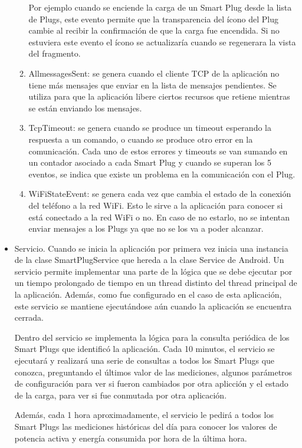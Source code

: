 \begin{itemize}
\begin{enumerate}
Por ejemplo cuando se enciende la carga de un Smart Plug desde la lista de Plugs, este evento permite que la transparencia del ícono del Plug cambie al recibir la confirmación de que la carga fue encendida. Si no estuviera este evento el ícono se actualizaría cuando se regenerara la vista del fragmento.
\item AllmessagesSent: se genera cuando el cliente TCP de la aplicación no tiene más mensajes que enviar en la lista de mensajes pendientes. Se utiliza para que la aplicación libere ciertos recursos que retiene mientras se están enviando los mensajes.
\item TcpTimeout: se genera cuando se produce un timeout esperando la respuesta a un comando, o cuando se produce otro error en la comunicación. Cada uno de estos errores y timeouts se van sumando en un contador asociado a cada Smart Plug y cuando se superan los 5 eventos, se indica que existe un problema en la comunicación con el Plug.
\item WiFiStateEvent: se genera cada vez que cambia el estado de la conexión del teléfono a la red WiFi. Esto le sirve a la aplicación para conocer si está conectado a la red WiFi o no. En caso de no estarlo, no se intentan enviar mensajes a los Plugs ya que no se los va a poder alcanzar.
\end{enumerate}

\item Servicio. Cuando se inicia la aplicación por primera vez inicia una instancia de la clase SmartPlugService que hereda a la clase Service de Android. Un servicio permite implementar una parte de la lógica que se debe ejecutar por un tiempo prolongado de tiempo en un thread distinto del thread principal de la aplicación. Además, como fue configurado en el caso de esta aplicación, este servicio se mantiene ejecutándose aún cuando la aplicación se encuentra cerrada.

Dentro del servicio se implementa la lógica para la consulta periódica de los Smart Plugs que identificó la aplicación. Cada 10 minutos, el servicio se ejecutará y realizará una serie de consultas a todos los Smart Plugs que conozca, preguntando el últimos valor de las mediciones, algunos parámetros de configuración para ver si fueron cambiados por otra aplicción y el estado de la carga, para ver si fue conmutada por otra aplicación.

Además, cada 1 hora aproximadamente, el servicio le pedirá a todos los Smart Plugs las mediciones históricas del día para conocer los valores de potencia activa y energía consumida por hora de la última hora.


\end{itemize}
